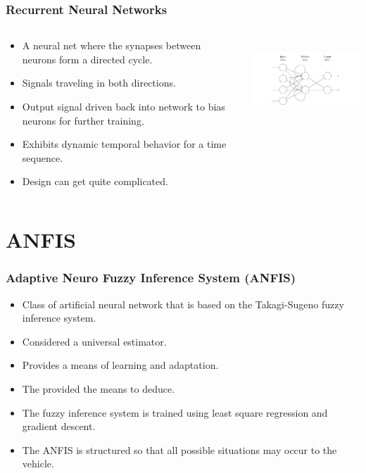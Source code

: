 \documentclass{beamer}
\begin{document}
   \begin{frame}
      \frametitle{Recurrent Neural Networks}
      \begin{columns}[T]
         \begin{column}[T]{5cm}
            \begin{itemize}
               \item A neural net where the synapses between neurons form a directed cycle.
               \item Signals traveling in both directions. 
               \item Output signal driven back into network to bias neurons for further training.
               \item Exhibits dynamic temporal behavior for a time sequence.
               \item Design can get quite complicated.
            \end{itemize}
         \end{column}
         \begin{column}[T]{5cm}
            \includegraphics[height=3cm]{recurrent}
         \end{column}
      \end{columns}
   \end{frame}

   \section{ANFIS}

   \begin{frame}
      \frametitle{Adaptive Neuro Fuzzy Inference System (ANFIS)}
      \begin{itemize}
         \item Class of artificial neural network that is based on the Takagi-Sugeno fuzzy inference system.
         \item Considered a universal estimator.
         \item Provides a means of learning and adaptation.
         \item The provided the means to deduce.
         \item The fuzzy inference system is trained using least square regression and gradient descent.
         \item The ANFIS is structured so that all possible situations may occur to the vehicle.
      \end{itemize}
   \end{frame}
\end{document}
